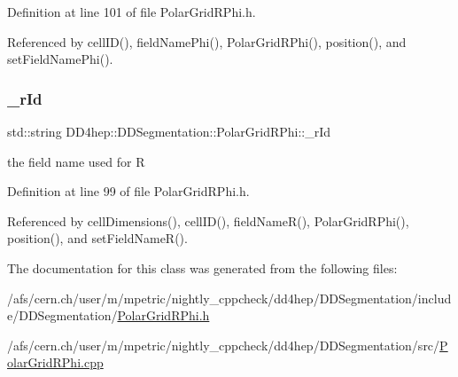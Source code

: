 Definition at line 101 of file Polar\+Grid\+R\+Phi.\+h.



Referenced by cell\+I\+D(), field\+Name\+Phi(), Polar\+Grid\+R\+Phi(), position(), and set\+Field\+Name\+Phi().

\hypertarget{class_d_d4hep_1_1_d_d_segmentation_1_1_polar_grid_r_phi_a8a4e4aea0a7943c8e77c1f9c8bdc5ffc}{}\label{class_d_d4hep_1_1_d_d_segmentation_1_1_polar_grid_r_phi_a8a4e4aea0a7943c8e77c1f9c8bdc5ffc} 
\subsubsection{\texorpdfstring{\+\_\+r\+Id}{\_rId}}
{\footnotesize\ttfamily std\+::string D\+D4hep\+::\+D\+D\+Segmentation\+::\+Polar\+Grid\+R\+Phi\+::\+\_\+r\+Id\hspace{0.3cm}{\ttfamily [protected]}}



the field name used for R 



Definition at line 99 of file Polar\+Grid\+R\+Phi.\+h.



Referenced by cell\+Dimensions(), cell\+I\+D(), field\+Name\+R(), Polar\+Grid\+R\+Phi(), position(), and set\+Field\+Name\+R().



The documentation for this class was generated from the following files\+:\begin{DoxyCompactItemize}
\item 
/afs/cern.\+ch/user/m/mpetric/nightly\+\_\+cppcheck/dd4hep/\+D\+D\+Segmentation/include/\+D\+D\+Segmentation/\hyperlink{_d_d_segmentation_2include_2_d_d_segmentation_2_polar_grid_r_phi_8h}{Polar\+Grid\+R\+Phi.\+h}\item 
/afs/cern.\+ch/user/m/mpetric/nightly\+\_\+cppcheck/dd4hep/\+D\+D\+Segmentation/src/\hyperlink{_d_d_segmentation_2src_2_polar_grid_r_phi_8cpp}{Polar\+Grid\+R\+Phi.\+cpp}\end{DoxyCompactItemize}
